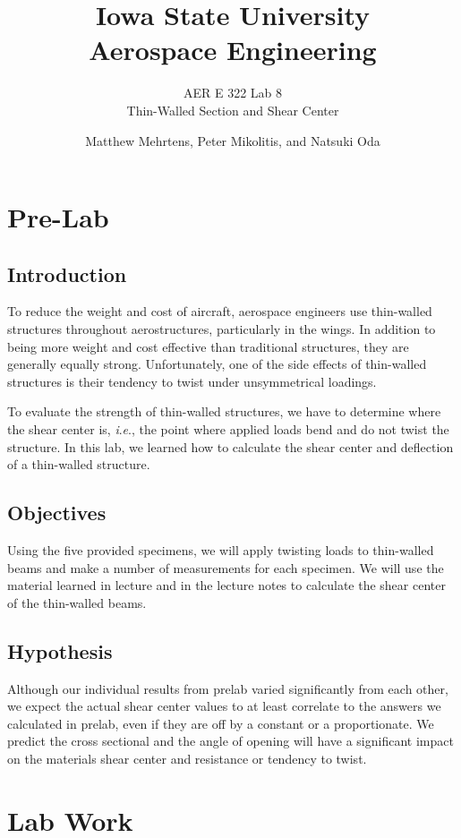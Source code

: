 \documentclass[12 pt]{report}
\title{\textbf{Iowa State University
\\{\Large Aerospace Engineering}}}
\subtitle{AER E 322 Lab 8\\
		  Thin-Walled Section and Shear Center}
\author{Matthew Mehrtens, Peter Mikolitis, and Natsuki Oda}
\newcommand{\ie}{\textit{i}.\textit{e}., }
\begin{document}
\maketitle
\tableofcontents

\chapter{Pre-Lab} \label{pre-lab}
\section{Introduction} \label{introduction}
To reduce the weight and cost of aircraft, aerospace engineers use thin-walled structures throughout aerostructures, particularly in the wings. In addition to being more weight and cost effective than traditional structures, they are generally equally strong. Unfortunately, one of the side effects of thin-walled structures is their tendency to twist under unsymmetrical loadings.

To evaluate the strength of thin-walled structures, we have to determine where the shear center is, \ie the point where applied loads bend and do not twist the structure. In this lab, we learned how to calculate the shear center and deflection of a thin-walled structure.

\section{Objectives} \label{objectives}
Using the five provided specimens, we will apply twisting loads to thin-walled beams and make a number of measurements for each specimen. We will use the material learned in lecture and in the lecture notes to calculate the shear center of the thin-walled beams. 

\section{Hypothesis} \label{hypothesis}
Although our individual results from prelab varied significantly from each other, we expect the actual shear center values to at least correlate to the answers we calculated in prelab, even if they are off by a constant or a proportionate. We predict the cross sectional and the angle of opening will have a significant impact on the materials shear center and resistance or tendency to twist.

\chapter{Lab Work} \label{lab_work}
\end{document}
